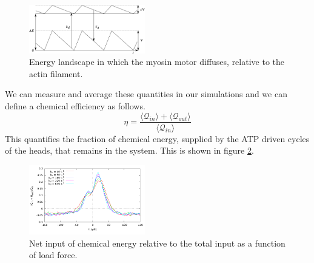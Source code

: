 \documentclass[aps,pre,twocolumn,showpacs,showkeys,a4paper]{revtex4}
\begin{document}
\begin{figure}[t]
\centering
\includegraphics[width=0.45\textwidth,height=!]{energy}
\caption{Energy landscape in which the myosin motor diffuses, relative to the actin filament.}
\label{Fig: energy}
\end{figure}
 We can measure and average these quantities in our simulations and we can define a chemical efficiency as follows.
\begin{equation}
\eta = \frac{\langle\mathcal Q_{in}\rangle+\langle\mathcal Q_{out}\rangle}{\langle\mathcal Q_{in}\rangle}
\end{equation}
This quantifies the fraction of chemical energy, supplied by the ATP driven cycles of the heads, that remains in the system. 
This is shown in figure \ref{Fig: chem}.
\begin{figure}[b]
\centering
\includegraphics[width=0.45\textwidth,height=!]{chemical_cycle}
\caption{Net input of chemical energy relative to the total input as a function of load force.}
\label{Fig: chem}
\end{figure}
\end{document}
